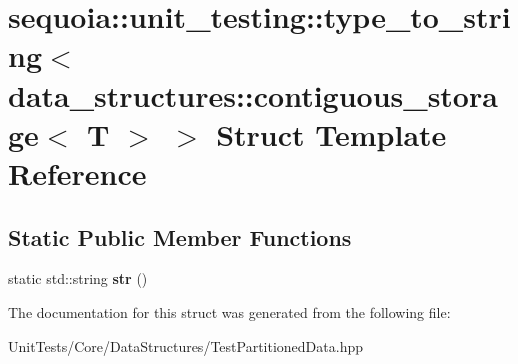 \hypertarget{structsequoia_1_1unit__testing_1_1type__to__string_3_01data__structures_1_1contiguous__storage_3_01_t_01_4_01_4}{}\section{sequoia\+::unit\+\_\+testing\+::type\+\_\+to\+\_\+string$<$ data\+\_\+structures\+::contiguous\+\_\+storage$<$ T $>$ $>$ Struct Template Reference}
\label{structsequoia_1_1unit__testing_1_1type__to__string_3_01data__structures_1_1contiguous__storage_3_01_t_01_4_01_4}
\subsection*{Static Public Member Functions}
\begin{DoxyCompactItemize}
\item 
\mbox{\label{structsequoia_1_1unit__testing_1_1type__to__string_3_01data__structures_1_1contiguous__storage_3_01_t_01_4_01_4_a1cfa5bc1e07efeebe7363947ff6689fb}} 
static std\+::string {\bfseries str} ()
\end{DoxyCompactItemize}


The documentation for this struct was generated from the following file\+:\begin{DoxyCompactItemize}
\item 
Unit\+Tests/\+Core/\+Data\+Structures/Test\+Partitioned\+Data.\+hpp\end{DoxyCompactItemize}
